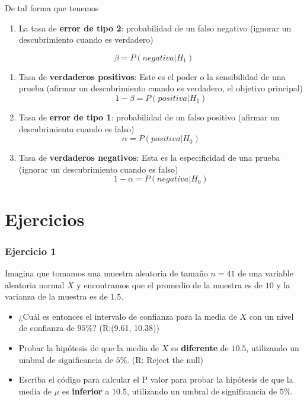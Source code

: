 \documentclass[
]{book}
\providecommand{\tightlist}{%
  \setlength{\itemsep}{0pt}\setlength{\parskip}{0pt}}
\begin{document}
De tal forma que tenemos

\begin{enumerate}
\def\labelenumi{\arabic{enumi}.}
\tightlist
\item
  La tasa de \textbf{error de tipo 2}: probabilidad de un falso negativo (ignorar un descubrimiento cuando es verdadero)
\end{enumerate}

\[\beta=P(negativa|H_1)\]

\begin{enumerate}
\def\labelenumi{\arabic{enumi}.}
\setcounter{enumi}{1}
\item
  Tasa de \textbf{verdaderos positivos}: Este es el poder o la sensibilidad de una prueba (afirmar un descubrimiento cuando es verdadero, el objetivo principal)
  \[1-\beta=P(positiva|H_1)\]
\item
  Tasa de \textbf{error de tipo 1}: probabilidad de un falso positivo (afirmar un descubrimiento cuando es falso)
  \[\alpha=P(positiva|H_0)\]
\item
  Tasa de \textbf{verdaderos negativos}: Esta es la especificidad de una prueba (ignorar un descubrimiento cuando es falso)
  \[1-\alpha=P(negativa|H_0)\]
\end{enumerate}

\hypertarget{ejercicios-12}{%
\section{Ejercicios}\label{ejercicios-12}}

\hypertarget{ejercicio-1-12}{%
\subsubsection{Ejercicio 1}\label{ejercicio-1-12}}

Imagina que tomamos una muestra aleatoria de tamaño \(n = 41\) de una variable aleatoria normal \(X\) y encontramos que el promedio de la muestra es de \(10\) y la varianza de la muestra es de \(1.5\).

\begin{itemize}
\item
  ¿Cuál es entonces el intervalo de confianza para la media de \(X\) con un nivel de confianza de \(95\%\)? (R:(9.61, 10.38))
\item
  Probar la hipótesis de que la media de \(X\) es \textbf{diferente} de \(10.5\), utilizando un umbral de significancia de \(5\%\). (R: Reject the null)
\item
  Escriba el código para calcular el P valor para probar la hipótesis de que la media de \(\mu\) es \textbf{inferior} a \(10.5\), utilizando un umbral de significancia de \(5\%\).
\end{itemize}
\end{document}
